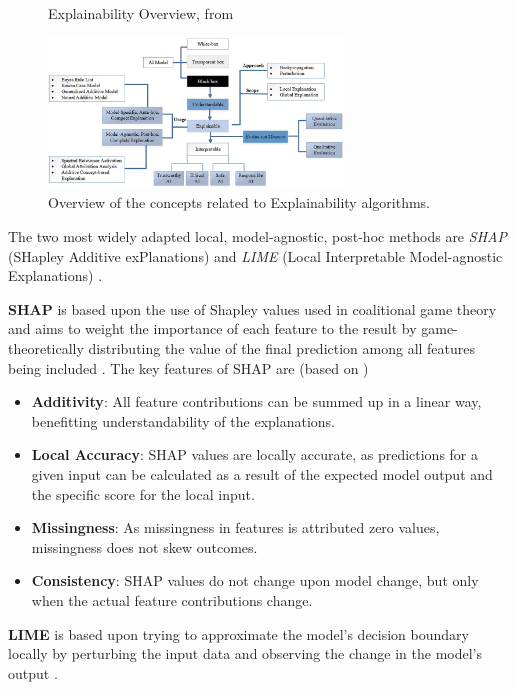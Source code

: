 \begin{figure}[h]
    \centering
    \caption{Explainability Overview, from \cite{SALEEM2022165}}
    \includegraphics[width=0.7\textwidth]{images/CH02_algorithms_overview_Saleem.jpg}
    \caption*{Overview of the concepts related to Explainability algorithms.}
    \label{fig:Explainability_overview}
\end{figure}

The two most widely adapted local, model-agnostic, post-hoc methods are \textit{SHAP} (SHapley Additive exPlanations) \parencite{Lundberg2017} and \textit{LIME} (Local Interpretable Model-agnostic Explanations) \parencite{Ribeiro2016}.

\textbf{SHAP} is based upon the use of Shapley values used in coalitional game theory and aims to weight the importance of each feature to the result by game-theoretically distributing the value of the final prediction among all features being included \parencite{Molnar2023}.
The key features of SHAP are (based on \cite{Molnar2023})
\begin{itemize}
    \item \textbf{Additivity}: All feature contributions can be summed up in a linear way, benefitting understandability of the explanations.
    \item \textbf{Local Accuracy}: SHAP values are locally accurate, as predictions for a given input can be calculated as a result of the expected model output and the specific score for the local input.
    \item \textbf{Missingness}: As missingness in features is attributed zero values, missingness does not skew outcomes.
    \item \textbf{Consistency}: SHAP values do not change upon model change, but only when the actual feature contributions change.
\end{itemize}

\textbf{LIME} is based upon trying to approximate the model's decision boundary locally by perturbing the input data and observing the change in the model's output \parencite{Molnar2023}.

